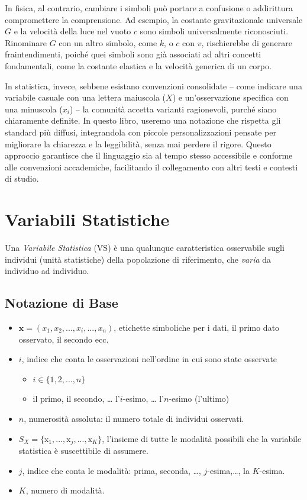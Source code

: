 \documentclass[
  11pt,
]{book}
\providecommand{\tightlist}{%
  \setlength{\itemsep}{0pt}\setlength{\parskip}{0pt}}
\theoremstyle{mytheoremstyle}
\theoremstyle{mydefstyle}
\begin{document}
In fisica, al contrario, cambiare i simboli può portare a confusione o addirittura compromettere la comprensione. Ad esempio, la costante gravitazionale universale \(G\) e la velocità della luce nel vuoto \(c\) sono simboli universalmente riconosciuti. Rinominare \(G\) con un altro simbolo, come \(k\), o \(c\) con \(v\), rischierebbe di generare fraintendimenti, poiché quei simboli sono già associati ad altri concetti fondamentali, come la costante elastica e la velocità generica di un corpo.

In statistica, invece, sebbene esistano convenzioni consolidate -- come indicare una variabile casuale con una lettera maiuscola (\(X\)) e un'osservazione specifica con una minuscola (\(x_i\)) -- la comunità accetta varianti ragionevoli, purché siano chiaramente definite. In questo libro, useremo una notazione che rispetta gli standard più diffusi, integrandola con piccole personalizzazioni pensate per migliorare la chiarezza e la leggibilità, senza mai perdere il rigore. Questo approccio garantisce che il linguaggio sia al tempo stesso accessibile e conforme alle convenzioni accademiche, facilitando il collegamento con altri testi e contesti di studio.

\section{Variabili Statistiche}\label{variabili-statistiche}

Una \emph{Variabile Statistica} (VS) è una qualunque caratteristica osservabile sugli individui (unità statistiche) della popolazione di riferimento, che \emph{varia} da individuo ad individuo.

\subsection{Notazione di Base}\label{notazione-di-base}

\begin{itemize}
\tightlist
\item
  \(\mathbf{x}=(x_1,x_2,...,x_i,...,x_n)\), etichette simboliche per i dati, il primo dato osservato, il secondo ecc.
\item
  \(i\), indice che conta le osservazioni nell'ordine in cui sono state osservate

  \begin{itemize}
  \tightlist
  \item
    \(i\in\{1,2,...,n\}\)
  \item
    il primo, il secondo, \ldots{} l'\(i\)-esimo, \ldots{} l'\(n\)-esimo (l'ultimo)
  \end{itemize}
\item
  \(n\), numerosità assoluta: il numero totale di individui osservati.
\item
  \(S_X=\{\mathrm{x}_1,...,\mathrm{x}_j,...,\mathrm{x}_K\}\), l'insieme di tutte le modalità possibili che la variabile statistica è suscettibile di assumere.
\item
  \(j\), indice che conta le modalità: prima, seconda, \ldots, \(j\)-esima,\ldots, la \(K\)-esima.
\item
  \(K\), numero di modalità.
\end{itemize}
\end{document}
